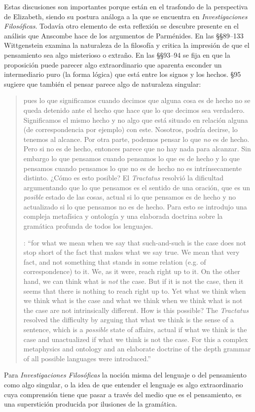 Estas discusiones son importantes porque están en el trasfondo de la perspectiva de Elizabeth, siendo su postura análoga a la que se encuentra en \emph{Investigaciones Filosóficas}. Todavía otro elemento de esta reflexión se descubre presente en el análisis que Anscombe hace de los argumentos de Parménides. En las \S\S89--133 Wittgenstein examina la naturaleza de la filosofía y critica la impresión de que el pensamiento sea algo misterioso o extraño. En las \S\S93--94 se fija en que la proposición puede parecer algo extraordinario que aparenta esconder un intermediario puro (la forma lógica) que está entre los signos y los hechos. \S95 sugiere que también el pensar parece algo de naturaleza singular: \blockquote[{\cite[4]{hacker2000mind}}: \enquote{for what we mean when we say that such-and-such is the case does not stop short of the fact that makes what we say true. We mean that very fact, and not something that stands in some relation (e.g. of correspondence) to it. We, as it were, reach right up to it. On the other hand, we can think what is \emph{not} the case. But if it is not the case, then it seems that there is nothing to reach right up to. Yet what we think when we think what is the case and what we think when we think what is not the case are not intrinsically different. How is this possible? The \emph{Tractatus} resolved the difficulty by arguing that what we think is the sense of a sentence, which is a \emph{possible} state of affairs, actual if what we think is the case and unactualized if what we think is not the case. For this a complex metaphysics and ontology and an elaborate doctrine of the depth grammar of all possible languages were introduced.}]{pues lo que significamos cuando decimos que alguna cosa es de hecho no se queda detenido ante el hecho que hace que lo que decimos sea verdadero. Significamos el mismo hecho y no algo que está situado en relación alguna (de correspondencia por ejemplo) con este. Nosotros, podría decirse, lo tenemos al alcance. Por otra parte, podemos pensar lo que \emph{no} es de hecho. Pero si no es de hecho, entonces parece que no hay nada para alcanzar. Sin embargo lo que pensamos cuando pensamos lo que es de hecho y lo que pensamos cuando pensamos lo que no es de hecho no es intrínsecamente distinto. ¿Cómo es esto posible? El \emph{Tractatus} resolvió la dificultad argumentando que lo que pensamos es el sentido de una oración, que es un \emph{posible} estado de las cosas, actual si lo que pensamos es de hecho y no actualizado si lo que pensamos no es de hecho. Para esto se introdujo una compleja metafísica y ontología y una elaborada doctrina sobre la gramática profunda de todos los lenguajes.} Para \emph{Investigaciones Filosóficas} la noción misma del lenguaje o del pensamiento como algo singular, o la idea de que entender el lenguaje es algo extraordinario cuya comprensión tiene que pasar a través del medio que es el pensamiento, es una superstición producida por ilusiones de la gramática.


